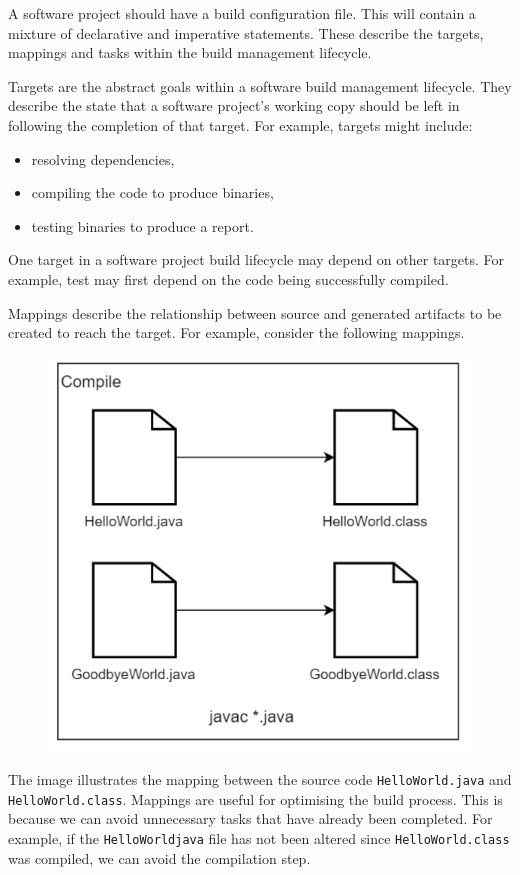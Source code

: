 \documentclass[a4paper, openany]{memoir}
\begin{document}
A software project should have a build configuration file. This will contain a mixture of declarative and imperative statements. These describe the targets, mappings and tasks within the build management lifecycle.

Targets are the abstract goals within a software build management lifecycle. They describe the state that a software project's working copy should be left in following the completion of that target. For example, targets might include: 
\begin{itemize}
    \item resolving dependencies,
    \item compiling the code to produce binaries,
    \item testing binaries to produce a report.
\end{itemize}
One target in a software project build lifecycle may depend on other targets. For example, test may first depend on the code being successfully compiled. 

Mappings describe the relationship between source and generated artifacts to be created to reach the target. For example, consider the following mappings.
\begin{figure}[H]
    \centering
    \includegraphics[scale=0.5]{src/8.1 Build Java Example.PNG}
\end{figure}
\noindent The image illustrates the mapping between the source code \texttt{HelloWorld.java} and \texttt{HelloWorld.class}. Mappings are useful for optimising the build process. This is because we can avoid unnecessary tasks that have already been completed. For example, if the \texttt{HelloWorldjava} file has not been altered since \texttt{HelloWorld.class} was compiled, we can avoid the compilation step.
\end{document}
